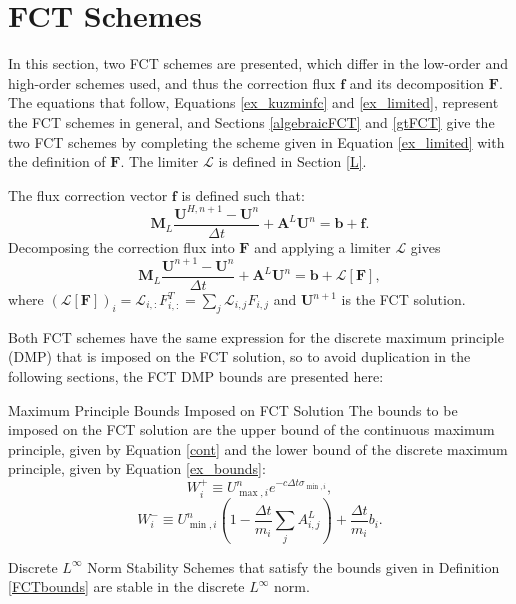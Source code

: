 \section{FCT Schemes}
In this section, two FCT schemes are presented, which
differ in the low-order and high-order schemes used, and thus the
correction flux $\mathbf{f}$ and its decomposition $\mathbf{F}$.
The equations that follow, Equations \eqref{ex_kuzminfc} and
\eqref{ex_limited}, represent the FCT schemes in general, and
Sections \ref{algebraicFCT} and \ref{gtFCT} give the two FCT
schemes by completing the scheme given in Equation \eqref{ex_limited}
with the definition of $\mathbf{F}$. The limiter $\mathcal{L}$ is
defined in Section \ref{L}.

The flux correction vector $\mathbf{f}$ is defined such that:
\begin{equation}\label{ex_kuzminfc}
   \mathbf{M}_L\frac{\mathbf{U}^{H,n+1}-\mathbf{U}^n}{\Delta t}
      + \mathbf{A}^L\mathbf{U}^n
      = \mathbf{b} + \mathbf{f}.
\end{equation}
Decomposing the correction flux into $\mathbf{F}$ and applying a limiter
$\mathcal{L}$ gives
\begin{equation}\label{ex_limited}
   \mathbf{M}_L\frac{\mathbf{U}^{n+1}-\mathbf{U}^n}{\Delta t}
      + \mathbf{A}^L\mathbf{U}^n
      = \mathbf{b} + \mathcal{L}[\mathbf{F}],
\end{equation}
where $(\mathcal{L}[\mathbf{F}])_i = \mathcal{L}_{i,:}F_{i,:}^T
= \sum\limits_j \mathcal{L}_{i,j}F_{i,j}$ and $\mathbf{U}^{n+1}$
is the FCT solution.

Both FCT schemes have the same expression for the discrete maximum principle (DMP)
that is imposed on the FCT solution, so to avoid duplication in the following
sections, the FCT DMP bounds are presented here:
\begin{definition}[label={FCTbounds}]{Maximum Principle Bounds Imposed on FCT Solution}
   The bounds to be imposed on the FCT solution are the upper bound of the
   continuous maximum principle, given by Equation \eqref{cont} and the
   lower bound of the discrete maximum principle, given by Equation
   \eqref{ex_bounds}:
   \begin{equation}\label{FCTupper}
      W_i^+\equiv U_{\max,i}^n e^{-c\Delta t\sigma_{\min,i}},
   \end{equation}
   \begin{equation}\label{FCTlower}
      W_i^-\equiv U_{\min,i}^n\left(1-\frac{\Delta t}{m_i}\sum\limits_j A^L_{i,j}\right)
      + \frac{\Delta t}{m_i}b_i.
   \end{equation}
\end{definition}
\begin{proposition}{Discrete $L^\infty$ Norm Stability}
   Schemes that satisfy the bounds given in Definition \ref{FCTbounds} are
   stable in the discrete $L^\infty$ norm.
\end{proposition}

